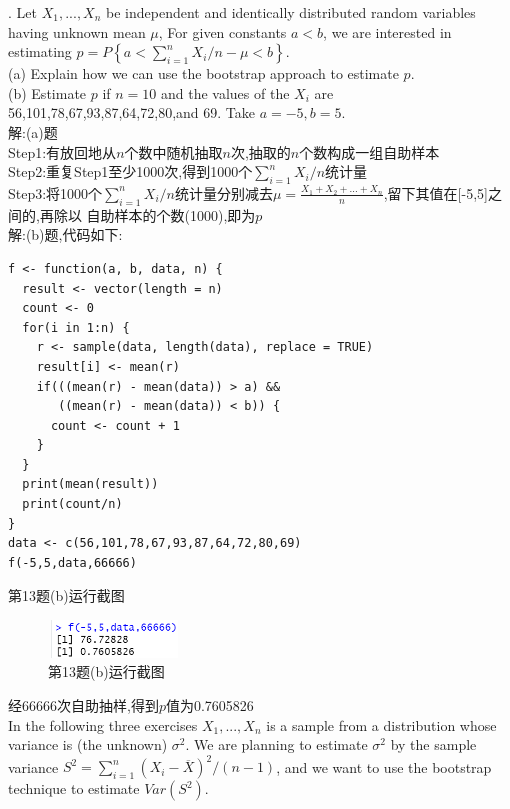 \documentclass{book}
\begin{document}
. Let $X_{1}, ..., X_{n}$ be independent and identically distributed random variables having unknown mean $\mu$,
For given constants $a < b$, we are interested in estimating $p = P\left\{a < \sum_{i=1}^{n}X_{i}/n-\mu < b\right\}$. \\
(a) Explain how we can use the bootstrap approach to estimate $p$.   \\
(b) Estimate $p$ if $n = 10$ and the values of the $X_{i}$ are 56,101,78,67,93,87,64,72,80,and 69. Take $a = -5, b= 5$. \\
解:(a)题 \\
Step1:有放回地从$n$个数中随机抽取$n$次,抽取的$n$个数构成一组自助样本 \\
Step2:重复Step1至少1000次,得到1000个$\sum_{i=1}^{n}X_{i}/n$统计量 \\
Step3:将1000个$\sum_{i=1}^{n}X_{i}/n$统计量分别减去$\mu=\frac{X_{1}+X_{2}+...+X_{n}}{n}$,留下其值在[-5,5]之间的,再除以
自助样本的个数(1000),即为$p$ \\
解:(b)题,代码如下:
\lstset{language = R}
\begin{lstlisting}
f <- function(a, b, data, n) {
  result <- vector(length = n)
  count <- 0
  for(i in 1:n) {
    r <- sample(data, length(data), replace = TRUE)
    result[i] <- mean(r)
    if(((mean(r) - mean(data)) > a) && 
       ((mean(r) - mean(data)) < b)) {
      count <- count + 1
    }
  }
  print(mean(result))
  print(count/n)
}
data <- c(56,101,78,67,93,87,64,72,80,69)
f(-5,5,data,66666)
\end{lstlisting}
第13题(b)运行截图
\begin{figure}[H]
    \centering
    \includegraphics*[height = 1cm, width = 3.5cm]{gramFile/第13题(b)运行截图.PNG}
    \caption{第13题(b)运行截图}
\end{figure}
\noindent
经66666次自助抽样,得到$p$值为0.7605826 \\

\noindent
In the following three exercises $X_{1}, ..., X_{n}$ is a sample from a distribution whose variance is (the unknown)
$\sigma^{2}$. We are planning to estimate $\sigma^{2}$ by the sample variance  $S^{2} = \sum_{i=1}^{n}(X_{i}-\overline{X})^{2}
    /(n-1)$, and we want to use the bootstrap technique to estimate $Var(S^{2})$.
\end{document}
